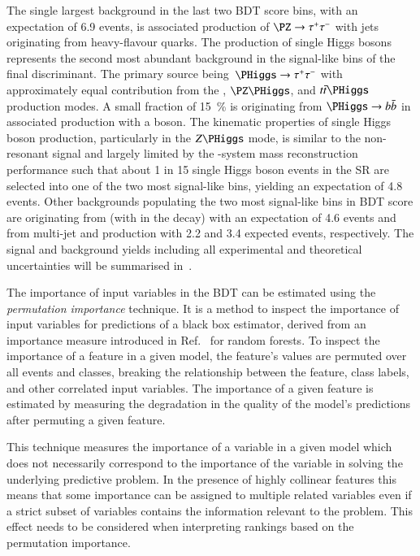 The single largest background in the last two BDT score bins, with an
expectation of 6.9 events, is associated production of
$\PZ \rightarrow \tautau$ with jets originating from heavy-flavour
quarks. The production of single Higgs bosons represents the second
most abundant background in the signal-like bins of the final
discriminant. The primary source being~$\PHiggs \rightarrow \tautau$
with approximately equal contribution from the \ggF, $\PZ\PHiggs$, and
$\ttbar\PHiggs$ production modes. A small fraction of
\SI{15}{\percent} is originating from $\PHiggs \rightarrow \bbbar$ in
associated production with a \PZ boson. The kinematic properties of
single Higgs boson production, particularly in the $Z\PHiggs$ mode, is
similar to the non-resonant \HH signal and largely limited by the
\PHiggs-system mass reconstruction performance such that about 1 in 15
single Higgs boson events in the SR are selected into one
of the two most signal-like bins, yielding an expectation of 4.8
events. Other backgrounds populating the two most signal-like bins in
BDT score are originating from \ttbar (with \truetauhadvis in the
decay) with an expectation of 4.6 events and \jettotauhadvis from
multi-jet and \ttbar production with 2.2 and 3.4 expected events,
respectively. The signal and background yields including all
experimental and theoretical uncertainties will be summarised
in~.

The importance of input variables in the BDT can be estimated using
the \emph{permutation importance} technique. It is a method to inspect
the importance of input variables for predictions of a black box
estimator, derived from an importance measure introduced in
Ref.~\cite{breiman01} for random forests. To inspect the importance of
a feature in a given model, the feature's values are permuted over all
events and classes, breaking the relationship between the feature,
class labels, and other correlated input variables. The importance of
a given feature is estimated by measuring the degradation in the
quality of the model's predictions after permuting a given feature.

This technique measures the importance of a variable in a given model
which does not necessarily correspond to the importance of the
variable in solving the underlying predictive problem. In the presence
of highly collinear features this means that some importance can be
assigned to multiple related variables even if a strict subset of
variables contains the information relevant to the problem. This
effect needs to be considered when interpreting rankings based on the
permutation importance.

